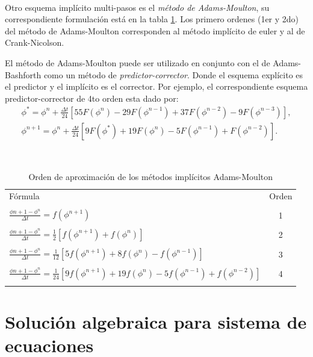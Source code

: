 \documentclass[a4paper,10pt, oneside]{book}
\begin{document}
$~$

\pagebreak

Otro esquema implícito multi-pasos es el \textit{método de Adams-Moulton}, su correspondiente formulación está en la tabla \ref{tabla53}. Los primero ordenes (1er y 2do) del método de Adams-Moulton corresponden al método implícito de euler y al de Crank-Nicolson. 

El método de Adams-Moulton puede ser utilizado en conjunto con el de Adams-Bashforth como un método de \textit{predictor-corrector}. Donde el esquema explícito es el predictor y el implícito es el corrector. Por ejemplo, el correspondiente esquema predictor-corrector de 4to orden esta dado por:
\begin{eqnarray}
	\phi^* = \phi^n + \frac{\Delta t}{24} \left[ 55 F(\phi^n) -29 F(\phi^{n-1}) + 37 F(\phi^{n-2}) - 9F(\phi^{n-3}) \right], \nonumber \\
	\phi^{n+1} = \phi^n + \frac{\Delta t}{24} \left[ 9 F(\phi^*) + 19 F(\phi^n) - 5 F(\phi^{n-1}) + F(\phi^{n-2}) \right]. \nonumber
\end{eqnarray}

$~$

\begin{table}[h]
\centering
\begin{tabular}{| l c |}
\hline
Fórmula & Orden \\
& \\
$\frac{\phi{n+1} - \phi^n}{\Delta t} = f(\phi^{n+1})$ & 1 \\
& \\
$\frac{\phi{n+1} - \phi^n}{\Delta t} = \frac12 \left[ f(\phi^{n+1}) + f(\phi^{n})\right]$ & 2 \\
& \\
$\frac{\phi{n+1} - \phi^n}{\Delta t} = \frac{1}{12} \left[ 5 f(\phi^{n+1}) + 8 f(\phi^{n}) - f(\phi^{n-1}) \right] $ & 3 \\
& \\
$\frac{\phi{n+1} - \phi^n}{\Delta t} = \frac{1}{24} \left[ 9 f(\phi^{n+1}) +19 f(\phi^n) -5 f(\phi^{n-1}) + f(\phi^{n-2}) \right]$ & 4 \\
& \\
\hline
\end{tabular}
\caption{Orden de aproximación de los métodos implícitos Adams-Moulton}
\label{tabla53}
\end{table}

\chapter{Solución algebraica para sistema de ecuaciones}
\end{document}
